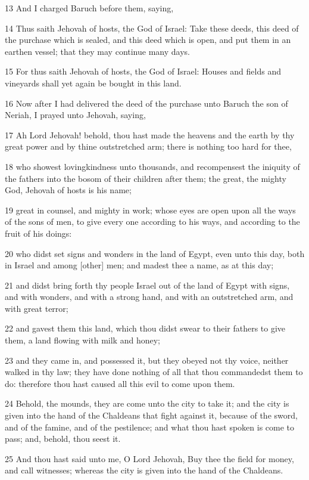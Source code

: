 \par 13 And I charged Baruch before them, saying,
\par 14 Thus saith Jehovah of hosts, the God of Israel: Take these deeds, this deed of the purchase which is sealed, and this deed which is open, and put them in an earthen vessel; that they may continue many days.
\par 15 For thus saith Jehovah of hosts, the God of Israel: Houses and fields and vineyards shall yet again be bought in this land.
\par 16 Now after I had delivered the deed of the purchase unto Baruch the son of Neriah, I prayed unto Jehovah, saying,
\par 17 Ah Lord Jehovah! behold, thou hast made the heavens and the earth by thy great power and by thine outstretched arm; there is nothing too hard for thee,
\par 18 who showest lovingkindness unto thousands, and recompensest the iniquity of the fathers into the bosom of their children after them; the great, the mighty God, Jehovah of hosts is his name;
\par 19 great in counsel, and mighty in work; whose eyes are open upon all the ways of the sons of men, to give every one according to his ways, and according to the fruit of his doings:
\par 20 who didst set signs and wonders in the land of Egypt, even unto this day, both in Israel and among [other] men; and madest thee a name, as at this day;
\par 21 and didst bring forth thy people Israel out of the land of Egypt with signs, and with wonders, and with a strong hand, and with an outstretched arm, and with great terror;
\par 22 and gavest them this land, which thou didst swear to their fathers to give them, a land flowing with milk and honey;
\par 23 and they came in, and possessed it, but they obeyed not thy voice, neither walked in thy law; they have done nothing of all that thou commandedst them to do: therefore thou hast caused all this evil to come upon them.
\par 24 Behold, the mounds, they are come unto the city to take it; and the city is given into the hand of the Chaldeans that fight against it, because of the sword, and of the famine, and of the pestilence; and what thou hast spoken is come to pass; and, behold, thou seest it.
\par 25 And thou hast said unto me, O Lord Jehovah, Buy thee the field for money, and call witnesses; whereas the city is given into the hand of the Chaldeans.
